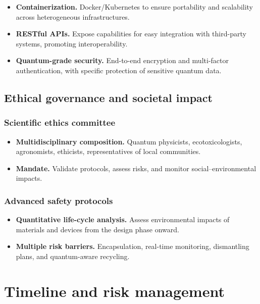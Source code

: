 \documentclass[12pt, a4paper]{article}
\begin{document}
\begin{itemize}
    \item \textbf{Containerization.} Docker/Kubernetes to ensure portability and scalability across heterogeneous infrastructures.
    
    \item \textbf{RESTful APIs.} Expose capabilities for easy integration with third-party systems, promoting interoperability.
    
    \item \textbf{Quantum-grade security.} End-to-end encryption and multi-factor authentication, with specific protection of sensitive quantum data.
\end{itemize}

\subsection{Ethical governance and societal impact}

\subsubsection{Scientific ethics committee}

\begin{itemize}
    \item \textbf{Multidisciplinary composition.} Quantum physicists, ecotoxicologists, agronomists, ethicists, representatives of local communities.
    
    \item \textbf{Mandate.} Validate protocols, assess risks, and monitor social–environmental impacts.
\end{itemize}

\subsubsection{Advanced safety protocols}

\begin{itemize}
    \item \textbf{Quantitative life-cycle analysis.} Assess environmental impacts of materials and devices from the design phase onward.
    
    \item \textbf{Multiple risk barriers.} Encapsulation, real-time monitoring, dismantling plans, and quantum-aware recycling.
\end{itemize}

\section{Timeline and risk management}
\end{document}

